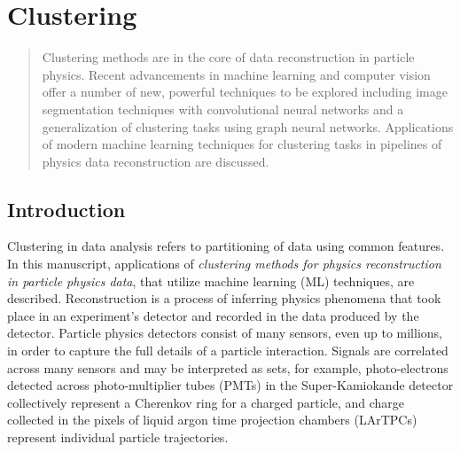 \documentclass{ws-rv9x6}
\begin{document}
\chapter{Clustering}\label{ra_ch1}

\author[Terao]{Kazuhiro Terao$^1$}

\address{$^1$SLAC National Accelerator Laboratory, 2575 Sand Hill Rd., Menlo Park, CA, 94025, U.S.A. \\
kterao@slac.stanford.edu}

\begin{abstract}
Clustering methods are in the core of data reconstruction in particle physics. Recent advancements in machine learning and computer vision offer a number of new, powerful techniques to be explored including image segmentation techniques with convolutional neural networks and a generalization of clustering tasks using graph neural networks. %
Applications of modern machine learning techniques for clustering tasks in pipelines of physics data reconstruction are discussed.

\end{abstract}
\body

\tableofcontents
\newpage

\section{Introduction}\label{sec:intro}
Clustering in data analysis refers to partitioning of data using common features. In this manuscript, applications of {\it clustering methods for physics reconstruction in particle physics data}, that utilize machine learning (ML) techniques, are described. Reconstruction is a process of inferring physics phenomena that took place in an experiment's detector and recorded in the data produced by the detector. Particle physics detectors consist of many sensors, even up to millions, in order to capture the full details of a particle interaction. Signals are correlated across many sensors and may be interpreted as sets, for example, photo-electrons detected across photo-multiplier tubes (PMTs) in the Super-Kamiokande detector collectively represent a Cherenkov ring for a charged particle, and charge collected in the pixels of liquid argon time projection chambers (LArTPCs) represent individual particle trajectories. 
\end{document}
